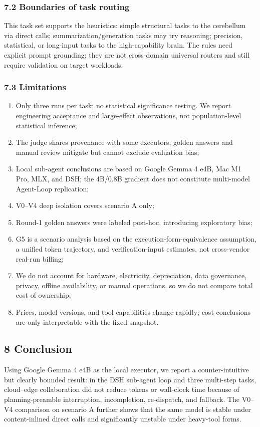 \documentclass[
]{article}
\begin{document}
\subsubsection{7.2 Boundaries of task routing}
This task set supports the heuristics: simple structural tasks to the cerebellum via direct calls; summarization/generation tasks may try reasoning; precision, statistical, or long-input tasks to the high-capability brain. The rules need explicit prompt grounding; they are not cross-domain universal routers and still require validation on target workloads.

\subsubsection{7.3 Limitations}
\begin{enumerate}
\item Only three runs per task; no statistical significance testing. We report engineering acceptance and large-effect observations, not population-level statistical inference;
\item The judge shares provenance with some executors; golden answers and manual review mitigate but cannot exclude evaluation bias;
\item Local sub-agent conclusions are based on Google Gemma 4 e4B, Mac M1 Pro, MLX, and DSH; the 4B/0.8B gradient does not constitute multi-model Agent-Loop replication;
\item V0--V4 deep isolation covers scenario A only;
\item Round-1 golden answers were labeled post-hoc, introducing exploratory bias;
\item G5 is a scenario analysis based on the execution-form-equivalence assumption, a unified token trajectory, and verification-input estimates, not cross-vendor real-run billing;
\item We do not account for hardware, electricity, depreciation, data governance, privacy, offline availability, or manual operations, so we do not compare total cost of ownership;
\item Prices, model versions, and tool capabilities change rapidly; cost conclusions are only interpretable with the fixed snapshot.
\end{enumerate}

\subsection{8 Conclusion}
Using Google Gemma 4 e4B as the local executor, we report a counter-intuitive but clearly bounded result: in the DSH sub-agent loop and three multi-step tasks, cloud--edge collaboration did not reduce tokens or wall-clock time because of planning-preamble interruption, incompletion, re-dispatch, and fallback. The V0--V4 comparison on scenario A further shows that the same model is stable under content-inlined direct calls and significantly unstable under heavy-tool forms.
\end{document}
